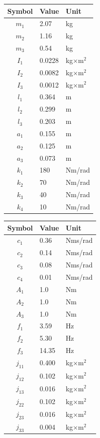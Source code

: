 \begin{tabular}{c|l|l}
    Symbol & Value & Unit \\
    \hline
    $m_1$ & 2.07 & kg \\
    $m_2$ & 1.16 & kg \\
    $m_3$ & 0.54 & kg \\
    $I_1$ & 0.0228 & kg$\times$m$^2$ \\
    $I_2$ & 0.0082 & kg$\times$m$^2$ \\
    $I_3$ & 0.0012 & kg$\times$m$^2$ \\
    $l_1$ & 0.364 & m \\
    $l_2$ & 0.299 & m \\
    $l_3$ & 0.203 & m \\
    $a_1$ & 0.155 & m \\
    $a_2$ & 0.125 & m \\
    $a_3$ & 0.073 & m \\
    $k_1$ & 180 & Nm/rad \\
    $k_2$ & 70 & Nm/rad \\
    $k_3$ & 40 & Nm/rad \\
    $k_4$ & 10 & Nm/rad
\end{tabular}
%
\begin{tabular}{c|l|l}
    Symbol & Value & Unit \\
    \hline
    $c_1$ & 0.36 & Nms/rad \\
    $c_2$ & 0.14 & Nms/rad \\
    $c_3$ & 0.08 & Nms/rad \\
    $c_4$ & 0.01 & Nms/rad \\
    $A_1$ & 1.0 & Nm \\
    $A_2$ & 1.0 & Nm \\
    $A_3$ & 1.0 & Nm \\
    $f_1$ & 3.59 & Hz \\
    $f_2$ & 5.30 & Hz \\
    $f_3$ & 14.35& Hz \\
    $j_{11}$ & 0.400 & kg$\times$m$^2$ \\
    $j_{12}$ & 0.102 & kg$\times$m$^2$ \\
    $j_{13}$ & 0.016 & kg$\times$m$^2$ \\
    $j_{22}$ & 0.102 & kg$\times$m$^2$ \\
    $j_{23}$ & 0.016 & kg$\times$m$^2$ \\
    $j_{33}$ & 0.004 & kg$\times$m$^2$
\end{tabular}
